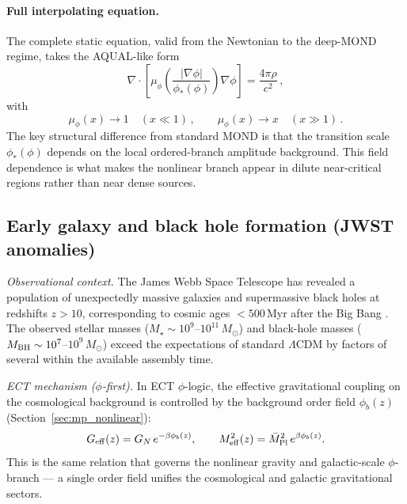 \documentclass[11pt,a4paper]{article}
\numberwithin{equation}{section}
\begin{document}
\paragraph{Full interpolating equation.}
The complete static equation, valid from the Newtonian to the
deep-MOND regime, takes the AQUAL-like form
\begin{equation}
\boxed{
\nabla\cdot\left[
  \mu_\phi\!\left(
    \frac{|\nabla\phi|}{\phi_*(\phi)}
  \right)\nabla\phi
\right]
= \frac{4\pi\rho}{c^2}\,,
}
\label{eq:aqual_phi_main}
\end{equation}
with
\begin{equation}
\mu_\phi(x) \to 1 \quad (x \ll 1)\,,
\qquad
\mu_\phi(x) \to x \quad (x \gg 1)\,.
\label{eq:mu_limits_main}
\end{equation}
The key structural difference from standard MOND is that the
transition scale $\phi_*(\phi)$ depends on the local
ordered-branch amplitude background. This field dependence is what makes
the nonlinear branch appear in dilute near-critical regions
rather than near dense sources.



\subsection{Early galaxy and black hole formation (JWST anomalies)}
\label{sec:jwst}

\textit{Observational context.}
The James Webb Space Telescope has revealed a population of unexpectedly massive
galaxies and supermassive black holes at redshifts $z>10$, corresponding to
cosmic ages $<500$\,Myr after the Big Bang \cite{Labbe2023,Finkelstein2022}.
The observed stellar masses ($M_\star\sim 10^{9}$--$10^{11}\,M_\odot$) and black-hole
masses ($M_{\rm BH}\sim 10^{7}$--$10^{9}\,M_\odot$) exceed the expectations of
standard $\Lambda$CDM by factors of several within the available assembly time.

\textit{ECT mechanism ($\phi$-first).}
In ECT $\phi$-logic, the effective gravitational coupling on the
cosmological background is controlled by the background order field
$\phi_b(z)$ (Section~\ref{sec:mp_nonlinear}):
\begin{equation}
  G_{\rm eff}(z) = G_N\,e^{-\beta\phi_b(z)},
  \qquad
  M^2_{\rm eff}(z) = \bar M^2_{\rm Pl}\,e^{\beta\phi_b(z)}.
  \label{eq:Geff_jwst}
\end{equation}
This is the same relation that governs the nonlinear gravity and
galactic-scale $\phi$-branch — a single order field unifies the
cosmological and galactic gravitational sectors.
\end{document}
